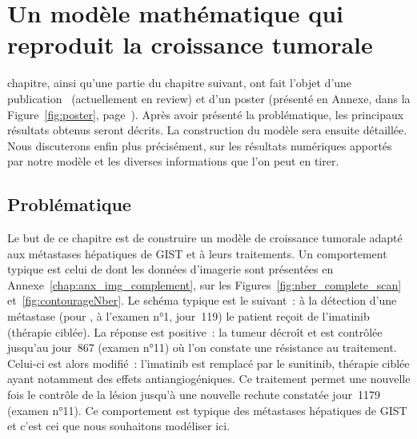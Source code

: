 \documentclass[main.tex]{subfiles}
\begin{document}
\chapter{Un modèle mathématique qui reproduit la croissance tumorale \label{chap:modele_EDP}}


 chapitre, ainsi qu'une partie du chapitre suivant, %
ont  fait l'objet d'une publication~\cite{lefebvre:hal-01089452} (actuellement en review) et d'un poster (présenté en Annexe, dans la Figure~\ref{fig:poster}, page~\pageref{fig:poster}). %
Après avoir présenté la problématique, les principaux résultats obtenus seront décrits.  
La construction du modèle sera ensuite détaillée. Nous discuterons enfin plus précisément, sur les résultats numériques apportés par notre modèle et les diverses informations que l'on peut en tirer.

\section{Problématique}
Le but de ce chapitre est de construire un modèle de croissance tumorale adapté aux métastases hépatiques de GIST et à leurs traitements. Un comportement typique est celui de \Nber dont les données d'imagerie sont présentées en Annexe~\ref{chap:anx_img_complement}, sur les Figures~\ref{fig:nber_complete_scan} et~\ref{fig:contourageNber}. Le schéma typique est le suivant~: à la détection d'une métastase (pour \Nber, à l'examen n°1, jour~119) le patient reçoit de l'imatinib (thérapie ciblée). La réponse est positive~: la tumeur décroît et est contrôlée jusqu'au jour~867 (examen n°11) où l'on constate une résistance au traitement. Celui-ci est alors modifié~: l'imatinib est  remplacé par le sunitinib, thérapie ciblée ayant notamment des effets antiangiogéniques. Ce traitement permet une nouvelle fois le contrôle de la lésion jusqu'à une nouvelle rechute constatée jour~1179 (examen n°11). Ce comportement est typique des métastases hépatiques de GIST et c'est cei que nous souhaitons modéliser ici.
\end{document}
